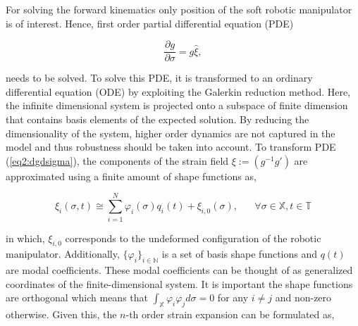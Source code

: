 For solving the forward kinematics only position of the soft robotic manipulator is of interest. Hence, first order partial differential equation (PDE)

\begin{equation}
    \frac{\partial g}{\partial \sigma} = g \hat{\xi},
    \label{eq2:dgdsigma}
\end{equation}

needs to be solved. To solve this PDE, it is transformed to an ordinary differential equation (ODE) by exploiting the Galerkin reduction method. Here, the infinite dimensional system is projected onto a subspace of finite dimension that contains basis elements of the expected solution. By reducing the dimensionality of the system, higher order dynamics are not captured in the model and thus robustness should be taken into account. To transform PDE (\ref{eq2:dgdsigma}), the components of the strain field $\xi := (g^{-1}g')$ are approximated using a finite amount of shape functions as,

\begin{equation}
    \xi_i(\sigma,t) \cong \sum_{i=1}^N \varphi_i(\sigma)q_i(t) + \xi_{i,0}(\sigma), \hspace{20pt} \forall \sigma \in \mathbb{X}, t \in \mathbb{T}
\end{equation}

in which, $\xi_{i,0}$ corresponds to the undeformed configuration of the robotic manipulator. Additionally, $\{\varphi_i\}_{i \in \mathbb{N}}$ is a set of basis shape functions and $q(t)$ are modal coefficients. These modal coefficients can be thought of as generalized coordinates of the finite-dimensional system.  It is important the shape functions are orthogonal which means that $\int_\mathbb{X} \varphi_i \varphi_j d \sigma = 0$ for any $i \neq j$ and non-zero otherwise. Given this, the $n$-th order strain expansion can be formulated as,



